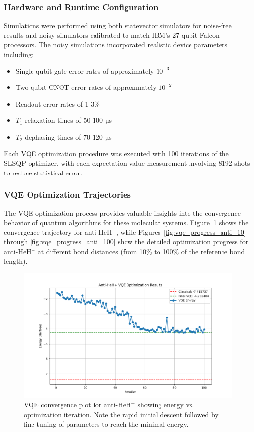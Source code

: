 \documentclass[10pt,twocolumn,a4paper]{article}
\begin{document}
\subsubsection{Hardware and Runtime Configuration}
Simulations were performed using both statevector simulators for noise-free results and noisy simulators calibrated to match IBM's 27-qubit Falcon processors. The noisy simulations incorporated realistic device parameters including:
\begin{itemize}
    \item Single-qubit gate error rates of approximately $10^{-3}$
    \item Two-qubit CNOT error rates of approximately $10^{-2}$
    \item Readout error rates of 1-3\%
    \item $T_1$ relaxation times of 50-100 µs
    \item $T_2$ dephasing times of 70-120 µs
\end{itemize}

Each VQE optimization procedure was executed with 100 iterations of the SLSQP optimizer, with each expectation value measurement involving 8192 shots to reduce statistical error.

\subsubsection{VQE Optimization Trajectories}
The VQE optimization process provides valuable insights into the convergence behavior of quantum algorithms for these molecular systems. Figure~\ref{fig:vqe_convergence_anti} shows the convergence trajectory for anti-HeH$^+$, while Figures~\ref{fig:vqe_progress_anti_10} through \ref{fig:vqe_progress_anti_100} show the detailed optimization progress for anti-HeH$^+$ at different bond distances (from 10\% to 100\% of the reference bond length).

\begin{figure}[t!]
    \centering
    \includegraphics[width=\columnwidth]{graphs/vqe_final_anti_heh+.png}
    \caption{VQE convergence plot for anti-HeH$^+$ showing energy vs. optimization iteration. Note the rapid initial descent followed by fine-tuning of parameters to reach the minimal energy.}
    \label{fig:vqe_convergence_anti}
\end{figure}
\end{document}
